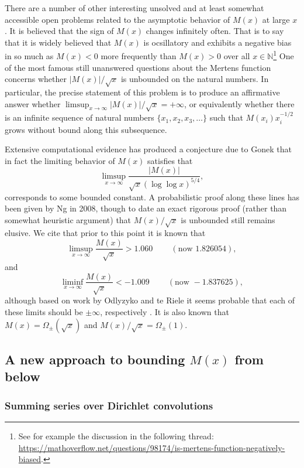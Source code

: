 \documentclass[11pt,reqno,a4letter]{article}
\numberwithin{figure}{section}
\numberwithin{table}{section}
\newcommand{\cf}{\textit{cf.\ }}
\theoremstyle{plain}
\numberwithin{theorem}{section}
\theoremstyle{definition}
\begin{document}
There are a number of other interesting unsolved and at 
least somewhat accessible open problems 
related to the asymptotic behavior of $M(x)$ at large $x$. 
It is believed that the sign of $M(x)$ changes infinitely often. 
That is to say that it is widely believed that $M(x)$ is 
ocsillatory and exhibits a negative bias in so much as 
$M(x) < 0$ more frequently than $M(x) > 0$ over all 
$x \in \mathbb{N}$\footnote{ 
     See for example the discussion in the following thread: \\ 
     \url{https://mathoverflow.net/questions/98174/is-mertens-function-negatively-biased}. 
}
One of the most famous still unanswered questions about the Mertens 
function concerns whether $|M(x)| / \sqrt{x}$ is unbounded on the 
natural numbers. In particular, the precise statement of this 
problem is to produce an affirmative answer whether 
$\limsup_{x \rightarrow \infty} |M(x)| / \sqrt{x} = +\infty$, or 
equivalently whether there is an infinite sequence of natural numbers 
$\{x_1, x_2, x_3, \ldots\}$ such that $M(x_i) x_i^{-1/2}$ grows without 
bound along this subsequence. 

Extensive computational evidence has produced 
a conjecture due to Gonek that in fact the limiting behavior of 
$M(x)$ satisfies 
that $$\limsup_{x \rightarrow \infty} \frac{|M(x)|}{\sqrt{x} 
(\log\log x)^{5/4}},$$ 
corresponds to some bounded constant. 
A probabilistic proof along these 
lines has been given by Ng in 2008, though to date an exact rigorous 
proof (rather than somewhat heuristic argument) that $M(x) / \sqrt{x}$ is 
unbounded still remains elusive. 
We cite that prior to this point it is known that \cite[\cf \S 4.1]{PRIMEREC} 
\[
\limsup_{x\rightarrow\infty} \frac{M(x)}{\sqrt{x}} > 1.060\ \qquad (\text{now } 1.826054), 
\] 
and 
\[ 
\liminf_{x\rightarrow\infty} \frac{M(x)}{\sqrt{x}} < -1.009\ \qquad (\text{now } -1.837625), 
\] 
although based on work by Odlyzyko and te Riele it seems probable that 
each of these limits should be $\pm \infty$, respectively 
\cite{ODLYZ-TRIELE,MREVISITED,ORDER-MERTENSFN,HURST-2017}. 
It is also known that $M(x) = \Omega_{\pm}(\sqrt{x})$ and 
$M(x) / \sqrt{x} = \Omega_{\pm}(1)$. 

\subsection{A new approach to bounding $M(x)$ from below} 

\subsubsection{Summing series over Dirichlet convolutions} 
\end{document}
